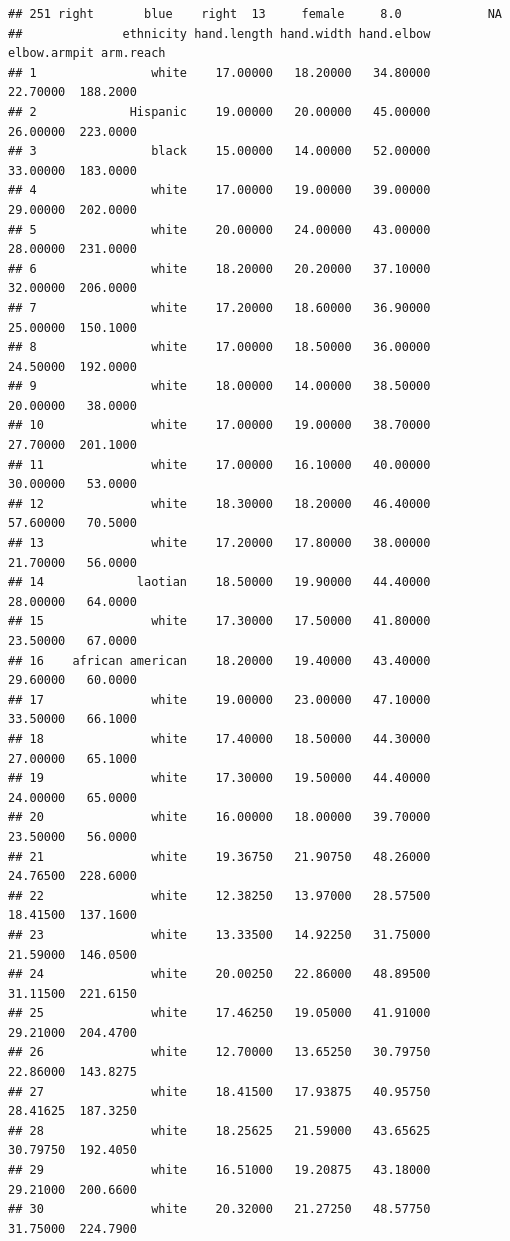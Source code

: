 \documentclass[]{article}
\begin{document}
\begin{verbatim}
## 251 right       blue    right  13     female     8.0            NA
##              ethnicity hand.length hand.width hand.elbow elbow.armpit arm.reach
## 1                white    17.00000   18.20000   34.80000     22.70000  188.2000
## 2             Hispanic    19.00000   20.00000   45.00000     26.00000  223.0000
## 3                black    15.00000   14.00000   52.00000     33.00000  183.0000
## 4                white    17.00000   19.00000   39.00000     29.00000  202.0000
## 5                white    20.00000   24.00000   43.00000     28.00000  231.0000
## 6                white    18.20000   20.20000   37.10000     32.00000  206.0000
## 7                white    17.20000   18.60000   36.90000     25.00000  150.1000
## 8                white    17.00000   18.50000   36.00000     24.50000  192.0000
## 9                white    18.00000   14.00000   38.50000     20.00000   38.0000
## 10               white    17.00000   19.00000   38.70000     27.70000  201.1000
## 11               white    17.00000   16.10000   40.00000     30.00000   53.0000
## 12               white    18.30000   18.20000   46.40000     57.60000   70.5000
## 13               white    17.20000   17.80000   38.00000     21.70000   56.0000
## 14             laotian    18.50000   19.90000   44.40000     28.00000   64.0000
## 15               white    17.30000   17.50000   41.80000     23.50000   67.0000
## 16    african american    18.20000   19.40000   43.40000     29.60000   60.0000
## 17               white    19.00000   23.00000   47.10000     33.50000   66.1000
## 18               white    17.40000   18.50000   44.30000     27.00000   65.1000
## 19               white    17.30000   19.50000   44.40000     24.00000   65.0000
## 20               white    16.00000   18.00000   39.70000     23.50000   56.0000
## 21               white    19.36750   21.90750   48.26000     24.76500  228.6000
## 22               white    12.38250   13.97000   28.57500     18.41500  137.1600
## 23               white    13.33500   14.92250   31.75000     21.59000  146.0500
## 24               white    20.00250   22.86000   48.89500     31.11500  221.6150
## 25               white    17.46250   19.05000   41.91000     29.21000  204.4700
## 26               white    12.70000   13.65250   30.79750     22.86000  143.8275
## 27               white    18.41500   17.93875   40.95750     28.41625  187.3250
## 28               white    18.25625   21.59000   43.65625     30.79750  192.4050
## 29               white    16.51000   19.20875   43.18000     29.21000  200.6600
## 30               white    20.32000   21.27250   48.57750     31.75000  224.7900

\end{verbatim}
\end{document}
